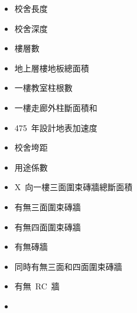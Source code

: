 \begin{multicols}{2}
\begin{itemize}
\item 校舍長度
\item 校舍深度
\item 樓層數
\item 地上層樓地板總面積
\item 一樓教室柱根數
\item 一樓走廊外柱斷面積和
\item 475~年設計地表加速度
\item 校舍垮距
\item 用途係數
\item X~向一樓三面圍束磚牆總斷面積
\item 有無三面圍束磚牆
\item 有無四面圍束磚牆
\item 有無磚牆
\item 同時有無三面和四面圍束磚牆
\item 有無~RC~牆
\item[]
\end{itemize}
\end{multicols}

